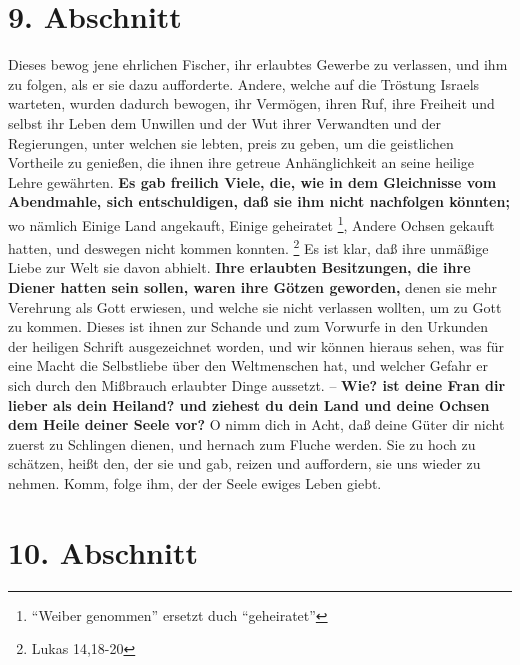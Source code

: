 \section{9. Abschnitt} \label{kap4_ab9}

Dieses bewog jene ehrlichen Fischer, ihr erlaubtes Gewerbe zu verlassen, und ihm
zu folgen, als er sie dazu aufforderte. Andere, welche auf die Tröstung Israels
warteten, wurden dadurch bewogen, ihr Vermögen, ihren Ruf, ihre Freiheit und
selbst ihr Leben dem Unwillen und der Wut ihrer Verwandten und der
Regierungen, unter welchen sie lebten, preis zu geben, um die geistlichen
Vortheile zu genießen, die ihnen ihre getreue Anhänglichkeit an seine heilige
Lehre gewährten. \textbf{Es gab freilich Viele, die, wie in dem Gleichnisse vom
Abendmahle, sich entschuldigen, daß sie ihm nicht nachfolgen könnten;} wo
nämlich
Einige Land angekauft, Einige geheiratet \footnote{"`Weiber genommen"' ersetzt
duch "`geheiratet"'}, Andere Ochsen gekauft hatten, und
deswegen nicht kommen konnten.
\footnote{Lukas  14,18-20}
Es ist klar, daß ihre
unmäßige Liebe zur Welt sie davon abhielt. \textbf{Ihre erlaubten Besitzungen,
die ihre
Diener hatten sein sollen, waren ihre Götzen  geworden,} denen sie
mehr Verehrung
als Gott erwiesen, und welche sie nicht verlassen wollten, um zu Gott zu kommen.
Dieses ist ihnen zur Schande und zum Vorwurfe in den Urkunden der heiligen
Schrift ausgezeichnet worden, und wir können hieraus sehen, was für eine Macht
die Selbstliebe über den Weltmenschen hat, und welcher Gefahr er sich durch den
Mißbrauch erlaubter Dinge aussetzt. -- \textbf{Wie? ist deine Fran dir lieber
als dein
Heiland? und ziehest du dein Land und deine Ochsen dem Heile deiner Seele vor?}
O
nimm dich in Acht, daß deine Güter dir nicht zuerst zu Schlingen dienen, und
hernach zum Fluche werden. Sie zu hoch zu schätzen, heißt den, der sie und gab,
reizen und auffordern, sie uns wieder zu nehmen. Komm, folge ihm, der der Seele
ewiges Leben giebt.

\section{10. Abschnitt} \label{kap4_ab10}

